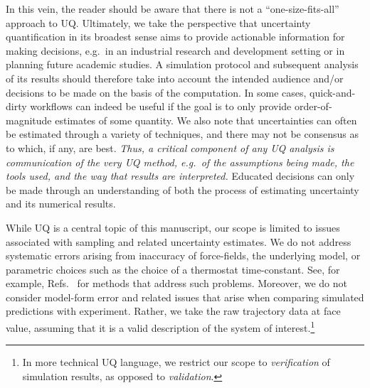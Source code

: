In this vein, the reader should be aware that there is not a ``one-size-fits-all'' approach to UQ.  Ultimately, we take the perspective that uncertainty quantification in its broadest sense aims to provide actionable information for making decisions, e.g.\ in an industrial research and development setting or in planning future academic studies.  A simulation protocol and subsequent analysis of its results should therefore take into account the intended audience and/or decisions to be made on the basis of the computation.  In some cases, quick-and-dirty workflows can indeed be useful if the goal is to only provide order-of-magnitude estimates of some quantity.  We also note that uncertainties can often be estimated through a variety of techniques, and there may not be consensus as to which, if any, are best.  {\it Thus, a critical component of any UQ analysis is communication of the very UQ method, e.g.\ of the assumptions being made, the tools used, and the way that results are interpreted.}  Educated decisions can only be made through an understanding of both the process of estimating uncertainty and its numerical results.

While UQ is a central topic of this manuscript, our scope is limited to issues associated with sampling and related uncertainty estimates.  We do not address systematic errors arising from inaccuracy of force-fields, the underlying model, or parametric choices such as the choice of a thermostat time-constant.  See, for example, Refs.~\cite{Leimkuhler,Rizzi2,Rizzi3,Rizzi4} for methods that address such problems.  Moreover, we do not consider model-form error and related issues that arise when comparing simulated predictions with experiment.  Rather, we take the raw trajectory data at face value, assuming that it is a valid description of the system of interest.\footnote{In more technical UQ language, we restrict our scope to {\it verification} of simulation results, as opposed to {\it validation}.}






